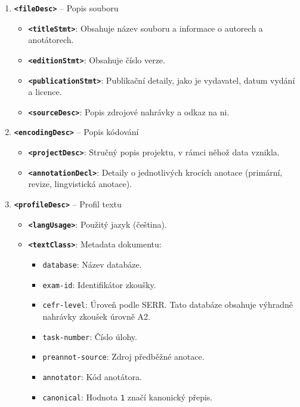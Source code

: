 \documentclass[
]{article}
\providecommand{\tightlist}{%
  \setlength{\itemsep}{0pt}\setlength{\parskip}{0pt}}
\begin{document}
\begin{enumerate}
\def\labelenumi{\arabic{enumi}.}
\tightlist
\item
  \textbf{\texttt{\textless{}fileDesc\textgreater{}}} -- Popis souboru

  \begin{itemize}
  \tightlist
  \item
    \textbf{\texttt{\textless{}titleStmt\textgreater{}}}: Obsahuje název
    souboru a informace o autorech a anotátorech.
  \item
    \textbf{\texttt{\textless{}editionStmt\textgreater{}}}: Obsahuje
    číslo verze.
  \item
    \textbf{\texttt{\textless{}publicationStmt\textgreater{}}}:
    Publikační detaily, jako je vydavatel, datum vydání a licence.
  \item
    \textbf{\texttt{\textless{}sourceDesc\textgreater{}}}: Popis
    zdrojové nahrávky a odkaz na ni.
  \end{itemize}
\item
  \textbf{\texttt{\textless{}encodingDesc\textgreater{}}} -- Popis
  kódování

  \begin{itemize}
  \tightlist
  \item
    \textbf{\texttt{\textless{}projectDesc\textgreater{}}}: Stručný
    popis projektu, v rámci něhož data vznikla.
  \item
    \textbf{\texttt{\textless{}annotationDecl\textgreater{}}}: Detaily o
    jednotlivých krocích anotace (primární, revize, lingvistická
    anotace).
  \end{itemize}
\item
  \textbf{\texttt{\textless{}profileDesc\textgreater{}}} -- Profil textu

  \begin{itemize}
  \tightlist
  \item
    \textbf{\texttt{\textless{}langUsage\textgreater{}}}: Použitý jazyk
    (čeština).
  \item
    \textbf{\texttt{\textless{}textClass\textgreater{}}}: Metadata
    dokumentu:

    \begin{itemize}
    \tightlist
    \item
      \texttt{database}: Název databáze.
    \item
      \texttt{exam-id}: Identifikátor zkoušky.
    \item
      \texttt{cefr-level}: Úroveň podle SERR. Tato databáze obsahuje
      výhradně nahrávky zkoušek úrovně A2.
    \item
      \texttt{task-number}: Číslo úlohy.
    \item
      \texttt{preannot-source}: Zdroj předběžné anotace.
    \item
      \texttt{annotator}: Kód anotátora.
    \item
      \texttt{canonical}: Hodnota \texttt{1} značí kanonický přepis.
    \end{itemize}
  \end{itemize}
\end{enumerate}
\end{document}
